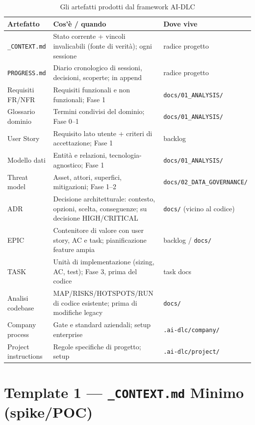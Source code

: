 \begin{table}[htbp]
  \centering\small
  \begin{tabular}{p{}p{}p{}}
    \toprule
    \textbf{Artefatto} & \textbf{Cos'è / quando} & \textbf{Dove vive} \\
    \midrule
    \texttt{\_CONTEXT.md} & Stato corrente + vincoli invalicabili (fonte di verità); ogni sessione & radice progetto \\
    \texttt{PROGRESS.md} & Diario cronologico di sessioni, decisioni, scoperte; in append & radice progetto \\
    Requisiti FR/NFR & Requisiti funzionali e non funzionali; Fase 1 & \texttt{docs/01\_ANALYSIS/} \\
    Glossario dominio & Termini condivisi del dominio; Fase 0--1 & \texttt{docs/01\_ANALYSIS/} \\
    User Story & Requisito lato utente + criteri di accettazione; Fase 1 & backlog \\
    Modello dati & Entità e relazioni, tecnologia-agnostico; Fase 1 & \texttt{docs/01\_ANALYSIS/} \\
    Threat model & Asset, attori, superfici, mitigazioni; Fase 1--2 & \texttt{docs/02\_DATA\_GOVERNANCE/} \\
    ADR & Decisione architetturale: contesto, opzioni, scelta, conseguenze; su decisione HIGH/CRITICAL & \texttt{docs/} (vicino al codice) \\
    EPIC & Contenitore di valore con user story, AC e task; pianificazione feature ampia & backlog / \texttt{docs/} \\
    TASK & Unità di implementazione (sizing, AC, test); Fase 3, prima del codice & task docs \\
    Analisi codebase & MAP/RISKS/HOTSPOTS/RUN di codice esistente; prima di modifiche legacy & \texttt{docs/} \\
    Company process & Gate e standard aziendali; setup enterprise & \texttt{.ai-dlc/company/} \\
    Project instructions & Regole specifiche di progetto; setup & \texttt{.ai-dlc/project/} \\
    \bottomrule
  \end{tabular}
  \caption{Gli artefatti prodotti dal framework AI-DLC}
  \label{tab:appc-artefatti}
\end{table}

\section*{Template 1 --- \texttt{\_CONTEXT.md} Minimo (spike/POC)}

